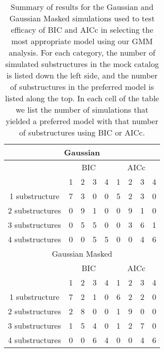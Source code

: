 \documentclass[onecolumn]{aastex}
\begin{document}
\begin{table}
\centering
\caption{Summary of results for the Gaussian and Gaussian Masked simulations used to test efficacy of BIC and AICc in selecting the most appropriate model using our GMM analysis.  For each category, the number of simulated substructures in the mock catalog is listed down the left side, and the number of substructures in the preferred model is listed along the top.  In each cell of the table we list the number of simulations that yielded a preferred model with that number of substructures using BIC or AICc.}
\label{tab:GMMResults1}
\begin{tabular}{c|cccc|cccc}

\hline
\hline
\multicolumn{9}{c}{Gaussian} \\ \hline
 & \multicolumn{4}{c|}{BIC} & \multicolumn{4}{c}{AICc}\\ \hline
 & 1 & 2 & 3 & 4 & 1 & 2 & 3 & 4 \\ \hline
1 substructure  & 7 & 3 & 0 & 0 & 5 & 2 & 3 & 0 \\
2 substructures & 0 & 9 & 1 & 0 & 0 & 9 & 1 & 0 \\
3 substructures & 0 & 5 & 5 & 0 & 0 & 3 & 6 & 1 \\
4 substructures & 0 & 0 & 5 & 5 & 0 & 0 & 4 & 6 \\
\hline
\hline
\multicolumn{9}{c}{Gaussian Masked} \\ \hline
 & \multicolumn{4}{c|}{BIC} & \multicolumn{4}{c}{AICc}\\ \hline
  & 1 & 2 & 3 & 4 & 1 & 2 & 3 & 4 \\ \hline
1 substructure  & 7 & 2 & 1 & 0 & 6 & 2 & 2 & 0 \\
2 substructures & 2 & 8 & 0 & 0 & 1 & 9 & 0 & 0 \\
3 substructures & 1 & 5 & 4 & 0 & 1 & 2 & 7 & 0 \\
4 substructures & 0 & 0 & 6 & 4 & 0 & 0 & 4 & 6 \\
\hline
\end{tabular}
\end{table}
\end{document}
